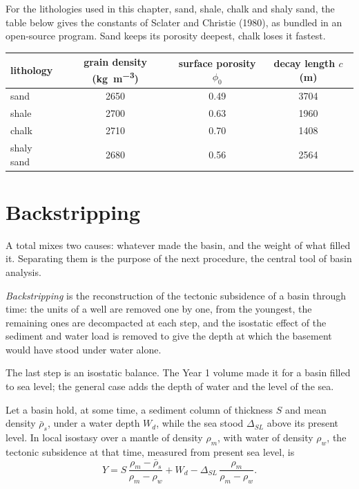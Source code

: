 For the lithologies used in this chapter, sand, shale, chalk and shaly sand, the table below
gives the constants of Sclater and Christie (1980), as bundled in an open-source program.
Sand keeps its porosity deepest, chalk loses it fastest.

\begin{center}
\small
\begin{tabular}{lccc}
\hline
lithology & grain density (\unit{kg.m^{-3}}) & surface porosity $\phi_0$ & decay length $c$ (\unit{m}) \\
\hline
sand & 2650 & 0.49 & 3704 \\
shale & 2700 & 0.63 & 1960 \\
chalk & 2710 & 0.70 & 1408 \\
shaly sand & 2680 & 0.56 & 2564 \\
\hline
\end{tabular}
\end{center}

\section{Backstripping}\label{sec:b2:basins-compared:backstripping}

A total  mixes two causes: whatever made the basin, and the weight of what
filled it. Separating them is the purpose of the next procedure, the central tool of basin
analysis.

\begin{definition}[Backstripping]\label{def:b2:basins-compared:backstripping}
\emph{Backstripping} is the reconstruction of the tectonic subsidence of a
basin through time: the units of a well are removed one by one, from the youngest, the
remaining ones are decompacted at each step, and the isostatic effect of the sediment and water
load is removed to give the depth at which the basement would have stood under water alone.
\end{definition}

The last step is an isostatic balance. The Year 1 volume made it for a basin filled to sea level;
the general case adds the depth of water and the level of the sea.

\begin{proposition}\label{prop:b2:basins-compared:backstrip}
Let a basin hold, at some time, a sediment column of thickness $S$ and mean density
$\bar\rho_s$, under a water depth $W_d$, while the sea stood $\Delta_{SL}$ above its present
level. In local isostasy over a mantle of density $\rho_m$, with water of density $\rho_w$, the
tectonic subsidence at that time, measured from present sea level, is
\[
  Y = S\,\frac{\rho_m - \bar\rho_s}{\rho_m - \rho_w} + W_d
      - \Delta_{SL}\,\frac{\rho_m}{\rho_m - \rho_w}.
\]
\end{proposition}

